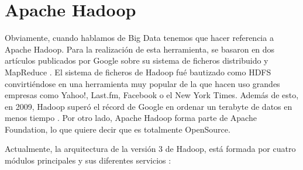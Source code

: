 \section{Apache Hadoop\label{Hadoop}}

Obviamente, cuando hablamos de Big Data tenemos que hacer referencia a
Apache Hadoop. Para la realización de esta herramienta, se basaron en dos
artículos publicados por Google sobre su sistema de ficheros distribuido
\cite{Hdp-2} y MapReduce \cite{Hdp-3}. El sistema de ficheros de Hadoop fué
bautizado como HDFS convirtiéndose en una herramienta muy popular de la que
hacen uso grandes empresas como Yahoo!, Last.fm, Facebook o el New York
Times. Además de esto, en 2009, Hadoop superó el récord de Google en
ordenar un terabyte de datos en menos tiempo \cite{Hdp-1}. Por otro lado,
Apache Hadoop forma parte de Apache Foundation, lo que quiere decir que es
totalmente OpenSource.

Actualmente, la arquitectura de la versión 3 de Hadoop, está formada por
cuatro módulos principales y sus diferentes servicios \cite{Hdp-4}:

